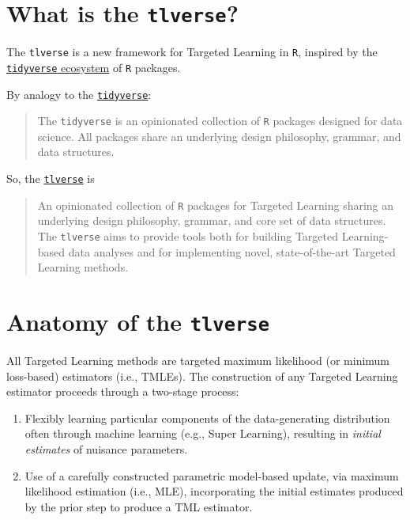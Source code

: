 \documentclass[
  12pt, krantz2,
]{krantz}
\newcommand{\passthrough}[1]{#1}
\providecommand{\tightlist}{%
  \setlength{\itemsep}{0pt}\setlength{\parskip}{0pt}}
\newcommand{\1}{\mathbbm{1}}
\theoremstyle{definition}
\theoremstyle{definition}
\theoremstyle{definition}
\theoremstyle{definition}
\theoremstyle{remark}
\begin{document}
\hypertarget{what-is-the-tlverse}{%
\section{\texorpdfstring{What is the \texttt{tlverse}?}{What is the tlverse?}}\label{what-is-the-tlverse}}

The \passthrough{\lstinline!tlverse!} is a new framework for Targeted Learning in \passthrough{\lstinline!R!}, inspired by
the \href{https://tidyverse.org}{\passthrough{\lstinline!tidyverse!} ecosystem} of \passthrough{\lstinline!R!} packages.

By analogy to the \href{https://tidyverse.org/}{\passthrough{\lstinline!tidyverse!}}:

\begin{quote}
The \passthrough{\lstinline!tidyverse!} is an opinionated collection of \passthrough{\lstinline!R!} packages designed for data
science. All packages share an underlying design philosophy, grammar, and data
structures.
\end{quote}

So, the \href{https://tlverse.org}{\passthrough{\lstinline!tlverse!}} is

\begin{quote}
An opinionated collection of \passthrough{\lstinline!R!} packages for Targeted Learning sharing an
underlying design philosophy, grammar, and core set of data structures. The
\passthrough{\lstinline!tlverse!} aims to provide tools both for building Targeted Learning-based
data analyses and for implementing novel, state-of-the-art Targeted Learning
methods.
\end{quote}

\hypertarget{anatomy-of-the-tlverse}{%
\section{\texorpdfstring{Anatomy of the \texttt{tlverse}}{Anatomy of the tlverse}}\label{anatomy-of-the-tlverse}}

All Targeted Learning methods are targeted maximum likelihood (or minimum
loss-based) estimators (i.e., TMLEs). The construction of any Targeted Learning
estimator proceeds through a two-stage process:

\begin{enumerate}
\def\labelenumi{\arabic{enumi}.}
\tightlist
\item
  Flexibly learning particular components of the data-generating distribution
  often through machine learning (e.g., Super Learning), resulting in \emph{initial
  estimates} of nuisance parameters.
\item
  Use of a carefully constructed parametric model-based update, via maximum
  likelihood estimation (i.e., MLE), incorporating the initial estimates
  produced by the prior step to produce a TML estimator.
\end{enumerate}
\end{document}
